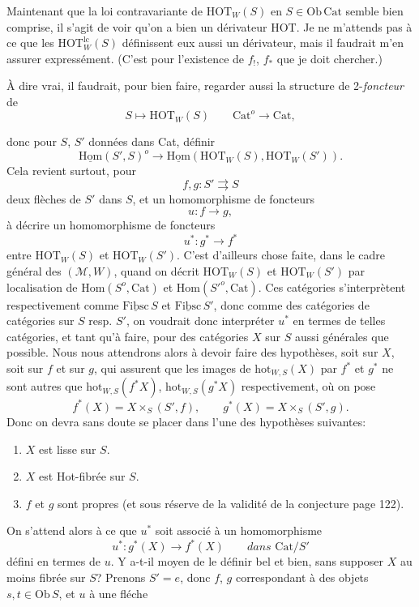 \documentclass[11pt]{article}
\newcommand{\printedpage}[1]{\marginpar{\footnotesize p.~#1}}
\newcommand{\msp}[1]{\marginpar{\footnotesize [#1]}}
\newcommand{\HOT}{\mathrm{HOT}}
\newcommand{\Cat}{\mathrm{Cat}}
\newcommand{\Ob}{\mathrm{Ob}}
\newcommand{\hot}{\mathrm{hot}}
\newcommand{\uHom}{\underline{\mathrm{Hom}}}
\newcommand{\uFibsc}{\underline{\mathrm{Fibsc}}}
\begin{document}
Maintenant que la loi contravariante de $\HOT_W(S)$ en $S \in \mathrm{Ob}\,\Cat$ semble bien comprise, il s'agit de voir qu'on a bien un dérivateur HOT. Je ne m'attends pas à ce que les $\HOT_W^{\mathrm{lc}}(S)$
\msp{page 128}
définissent eux aussi un dérivateur, mais il faudrait m'en assurer expressément. (C'est pour l'existence de $f_!$, $f_*$ que je doit chercher.) %

À dire vrai, il faudrait, pour bien faire, regarder aussi la structure de 2-\textit{foncteur} de
\[
S \longmapsto \HOT_W(S) \qquad \Cat^o \longrightarrow \Cat,
\]

\printedpage{79}

donc pour $S$, $S'$ données dans Cat, définir
\[ \uHom(S',S)^o \longrightarrow \uHom(\HOT_W(S),\HOT_W(S')). \]
Cela revient surtout, pour
\[ f,g : S' \rightrightarrows S \]
deux flèches de $S'$ dans $S$, et un homomorphisme de foncteurs
\[ u : f \longrightarrow g, \]
à décrire un homomorphisme de foncteurs
\[ u^* : g^* \longrightarrow f^* \]
entre $\HOT_W(S)$ et $\HOT_W(S')$. C'est d'ailleurs chose faite, dans le cadre général des $(\mathcal{M},W)$, quand on décrit $\HOT_W(S)$ et $\HOT_W(S')$ par localisation de $\mathrm{Hom}(S^o,\Cat)$ et $\mathrm{Hom}(S'^o,\Cat)$. Ces catégories s'interprètent respectivement comme $\uFibsc\,S$ et $\uFibsc\,S'$, donc comme des catégories de catégories sur $S$ resp. $S'$, on voudrait donc interpréter $u^*$ en termes de telles catégories, et tant qu'à faire, pour des catégories $X$ sur $S$ aussi générales que possible. Nous nous
\msp{page 129}
attendrons alors à devoir faire des hypothèses, soit sur $X$, soit sur $f$ et sur $g$, qui assurent que les images de $\hot_{W,S}(X)$ par $f^*$ et $g^*$ ne sont autres que $\hot_{W,S}(f^*X)$, $\hot_{W,S}(g^*X)$ respectivement, où on pose
\[ f^*(X) = X \times_S (S',f), \qquad g^*(X) = X \times_S (S',g). \]
Donc on devra sans doute se placer dans l'une des hypothèses suivantes:
\begin{enumerate}
\item[a)] $X$ est lisse sur $S$.
\item[b)] $X$ est Hot-fibrée sur $S$.
\item[c)] $f$ et $g$ sont propres (et sous réserve de la validité de la conjecture page 122).
\end{enumerate}
On s'attend alors à ce que $u^*$ soit associé à un homomorphisme
\[ u^* : g^*(X) \longrightarrow f^*(X) \qquad \textit{dans } \Cat/S' \]
défini en termes de $u$. Y a-t-il moyen de le définir bel et bien, sans supposer $X$ au moins fibrée sur $S$? Prenons $S'=e$, donc $f$, $g$ correspondant à des objets $s,t\in\Ob\,S$, et $u$ à une fléche %
\end{document}
